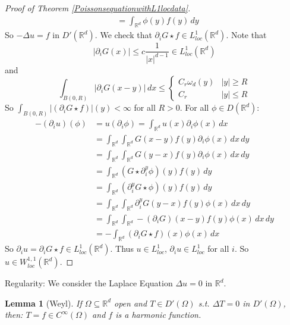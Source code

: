 \documentclass{report}
\theoremstyle{tommy}
\newtheorem{lem}[defn]{Lemma}
\begin{document}
\begin{proof}[Proof of Theorem \ref{PoissonsequationwithL1locdata}]
\begin{align*}
      &= \int_{\mathbb{R}^d} \phi(y) f(y) \, dy
    \end{align*}
    So \(-\Delta u = f\) in \(D'(\mathbb{R}^d)\). We check that \(\partial_i G \star f \in L_{loc}^1(\mathbb{R}^d)\). Note that 
    \[|\partial_i G(x)| \le c \frac{1}{|x|^{d-1}} \in L_{loc}^1(\mathbb{R}^d)\]
    and
    \[\int_{B(0,R)} |\partial_i G(x-y)| \, dx \le \begin{cases}
      C_r \omega_d(y) & |y| \ge R \\ C_r & |y| \le R
    \end{cases}\]
    So \(\int_{B(0,R)} |(\partial_i G\star f)|(y) < \infty\) for all \(R > 0\). For all \(\phi \in D(\mathbb{R}^d)\): 
    \begin{align*}
      -(\partial_i u)(\phi) 
      &= u(\partial_i \phi)
      = \int_{\mathbb{R}^d} u(x) \partial_i \phi(x) \, dx \\
      &= \int_{\mathbb{R}^d} \int_{\mathbb{R}^d} G(x-y) f(y) \partial_i \phi(x) \, dx \, dy \\
      &= \int_{\mathbb{R}^d} \int_{\mathbb{R}^d} G(y-x) f(y) \partial_i \phi(x) \, dx \, dy \\
      &= \int_{\mathbb{R}^d} (G \star \partial_i^y \phi)(y) f(y) \, dy \\
      &= \int_{\mathbb{R}^d}(\partial_i^y G \star \phi)(y) f(y) \, dy \\
      &= \int_{\mathbb{R}^d} \int_{\mathbb{R}^d} \partial_i^y G(y-x) f(y) \phi(x) \, dx \, dy \\
      &= \int_{\mathbb{R}^d} \int_{\mathbb{R}^d} -(\partial_i G)(x-y) f(y) \phi(x) \, dx \, dy \\
      &= - \int_{\mathbb{R}^d} (\partial_i G \star f)(x) \phi(x) \, dx
    \end{align*}
    So \(\partial_i u = \partial_i G \star f \in L_{loc}^1(\mathbb{R}^d)\). Thus \(u \in L_{loc}^1\), \(\partial_i u \in L_{loc}^1\) for all \(i\). So \(u \in W_{loc}^{1,1}(\mathbb{R}^d)\).
  \end{proof}

  Regularity: We consider the Laplace Equation \(\Delta u = 0\) in \(\mathbb{R}^d\).

  
  \begin{lem}[Weyl]\label{weyl}
    If \(\Omega \subseteq \mathbb{R}^d\) open and \(T \in D'(\Omega)\) s.t. \(\Delta T = 0\) in \(D'(\Omega)\), then: \(T = f \in C^\infty(\Omega)\) and \(f\) is a harmonic function.
  \end{lem}
\end{document}
